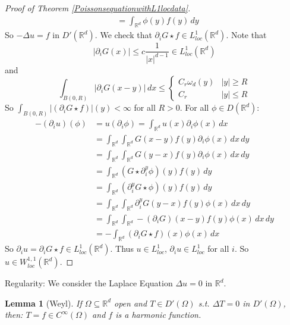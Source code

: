 \documentclass{report}
\theoremstyle{tommy}
\newtheorem{lem}[defn]{Lemma}
\begin{document}
\begin{proof}[Proof of Theorem \ref{PoissonsequationwithL1locdata}]
\begin{align*}
      &= \int_{\mathbb{R}^d} \phi(y) f(y) \, dy
    \end{align*}
    So \(-\Delta u = f\) in \(D'(\mathbb{R}^d)\). We check that \(\partial_i G \star f \in L_{loc}^1(\mathbb{R}^d)\). Note that 
    \[|\partial_i G(x)| \le c \frac{1}{|x|^{d-1}} \in L_{loc}^1(\mathbb{R}^d)\]
    and
    \[\int_{B(0,R)} |\partial_i G(x-y)| \, dx \le \begin{cases}
      C_r \omega_d(y) & |y| \ge R \\ C_r & |y| \le R
    \end{cases}\]
    So \(\int_{B(0,R)} |(\partial_i G\star f)|(y) < \infty\) for all \(R > 0\). For all \(\phi \in D(\mathbb{R}^d)\): 
    \begin{align*}
      -(\partial_i u)(\phi) 
      &= u(\partial_i \phi)
      = \int_{\mathbb{R}^d} u(x) \partial_i \phi(x) \, dx \\
      &= \int_{\mathbb{R}^d} \int_{\mathbb{R}^d} G(x-y) f(y) \partial_i \phi(x) \, dx \, dy \\
      &= \int_{\mathbb{R}^d} \int_{\mathbb{R}^d} G(y-x) f(y) \partial_i \phi(x) \, dx \, dy \\
      &= \int_{\mathbb{R}^d} (G \star \partial_i^y \phi)(y) f(y) \, dy \\
      &= \int_{\mathbb{R}^d}(\partial_i^y G \star \phi)(y) f(y) \, dy \\
      &= \int_{\mathbb{R}^d} \int_{\mathbb{R}^d} \partial_i^y G(y-x) f(y) \phi(x) \, dx \, dy \\
      &= \int_{\mathbb{R}^d} \int_{\mathbb{R}^d} -(\partial_i G)(x-y) f(y) \phi(x) \, dx \, dy \\
      &= - \int_{\mathbb{R}^d} (\partial_i G \star f)(x) \phi(x) \, dx
    \end{align*}
    So \(\partial_i u = \partial_i G \star f \in L_{loc}^1(\mathbb{R}^d)\). Thus \(u \in L_{loc}^1\), \(\partial_i u \in L_{loc}^1\) for all \(i\). So \(u \in W_{loc}^{1,1}(\mathbb{R}^d)\).
  \end{proof}

  Regularity: We consider the Laplace Equation \(\Delta u = 0\) in \(\mathbb{R}^d\).

  
  \begin{lem}[Weyl]\label{weyl}
    If \(\Omega \subseteq \mathbb{R}^d\) open and \(T \in D'(\Omega)\) s.t. \(\Delta T = 0\) in \(D'(\Omega)\), then: \(T = f \in C^\infty(\Omega)\) and \(f\) is a harmonic function.
  \end{lem}
\end{document}
